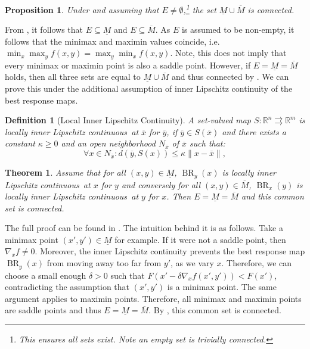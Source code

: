 \documentclass{article}
\newtheorem{theorem}{Theorem}
\newtheorem{definition}{Definition}[section]
\newtheorem{prop}{Proposition}
\newcommand{\R}{\mathbb{R}}
\newcommand{\locinnlip}{locally inner Lipschitz continuous}
\newcommand{\Locinnlip}{Local Inner Lipschitz Continuity}
\newcommand{\lilc}{locally inner Lipschitz continuous}
\DeclareMathOperator{\BR}{BR}
\begin{document}
\begin{prop}
\label{prop:stackelberg}
    Under  and assuming that $E\neq \emptyset$,\footnote{This ensures all sets exist. Note an empty set is trivially connected.} the set $\underline{M} \cup \overline{M}$ is connected.
\end{prop}


From , it follows that $E \subseteq \underline{M}$ and $E \subseteq \overline{M}$. As $E$ is assumed to be non-empty, it follows that the minimax and maximin values coincide, i.e. $\min_x\max_y f(x,y)=\max_y\min_x f(x,y)$. Note, this does not imply that every minimax or maximin point is also a saddle point. However, if $E=\underline{M}=\overline{M}$ holds, then all three sets are equal to $\underline{M} \cup \overline{M}$ and thus connected by . We can prove this under the additional assumption of inner Lipschitz continuity of the best response maps.


\begin{definition}[\Locinnlip]
\label{def:lilc}
A set-valued map $S:\R^n \rightrightarrows \R^{m}$ is \locinnlip\ at $\overline{x}$ for $\overline{y}$, if $\overline{y}\in S(\overline{x})$ and there exists a constant $\kappa \geq 0$ and an open neighborhood $N_{\overline{x}}$ of $\overline{x}$ such that:
\begin{equation*}
    \forall x \in N_{\overline{x}}: d(\overline{y},S(x)) \leq \kappa \|x-\overline{x}\|,
\end{equation*}
\end{definition}



\begin{theorem}
\label{thm:lilc} Assume that for all $(x,y)\in \underline{M}$, $\BR_y(x)$ is \lilc\ at $x$ for $y$ and conversely for all $(x,y)\in \overline{M}$, $\BR_x(y)$ is \lilc\ at $y$ for $x$. Then $E=\underline{M}=\overline{M}$ and this common set is connected.
\end{theorem}

The full proof can be found in . The intuition behind it is as follows.
Take a minimax point $(x',y')\in \underline{M}$ for example. If it were not a saddle point, then $\nabla_x f \neq 0$. Moreover, the inner Lipschitz continuity prevents the best response map $\BR_y(x)$ from moving away too far from $y'$, as we vary $x$. Therefore, we can choose a small enough $\delta>0$ such that $F(x'-\delta \nabla_x f(x',y'))<F(x')$, contradicting the assumption that $(x',y')$ is a minimax point. The same argument applies to maximin points. Therefore, all minimax and maximin points are saddle points and thus $E=\underline{M}=\overline{M}$. By , this common set is connected.
\end{document}
